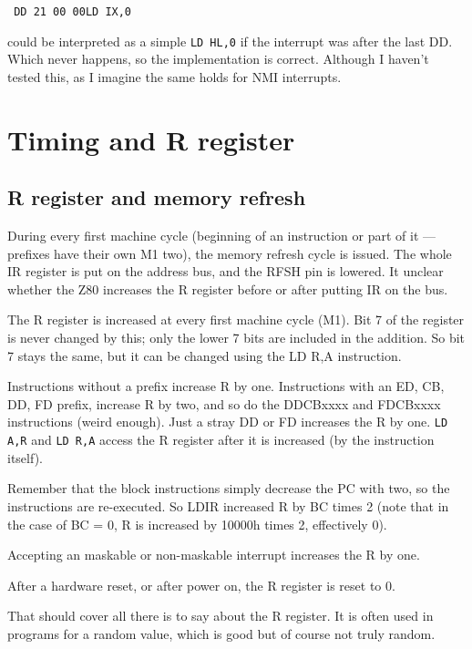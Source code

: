 \documentclass[oneside,a4paper]{book}
\begin{document}
{\tt
{\qquad}DD 21 00 00{\qquad}LD IX,0
}

could be interpreted as a simple {\tt LD HL,0} if the interrupt was after the 
last DD. Which never happens, so the implementation is correct.
Although I haven't tested this, as I imagine the same holds for NMI interrupts. 




\chapter{Timing and R register}

\section{R register and memory refresh}

During every first machine cycle (beginning of an instruction or part
of it --- prefixes have their own M1 two), the memory refresh cycle is
issued. The whole IR register is put on the address bus, and the RFSH pin is 
lowered.  It unclear whether the Z80 increases the R register before or after 
putting IR on the bus. 

The R register is increased at every first machine cycle (M1). Bit 7 of
the register is never changed by this; only the lower 7 bits are included
in the addition. So bit 7 stays the same, but it can be changed using the
{\ttfamily LD R,A} instruction.

Instructions without a prefix increase R by one. Instructions with an ED, CB,
DD, FD prefix, increase R by two, and so do the DDCBxxxx and FDCBxxxx 
instructions (weird enough). Just a stray DD or FD increases the R by
one. {\tt LD A,R} and {\tt LD R,A} access the R register after it is 
increased (by the instruction itself). 

Remember that the block instructions simply decrease the PC with two, so
the instructions are re-executed. So LDIR increased R by BC times 2 (note that
in the case of BC = 0, R is increased by 10000h times 2, effectively 0).

Accepting an maskable or non-maskable interrupt increases the R by one.

After a hardware reset, or after power on, the R register is reset to 0.

That should cover all there is to say about the R register. It is often
used in programs for a random value, which is good but of course not
truly random.
\end{document}
